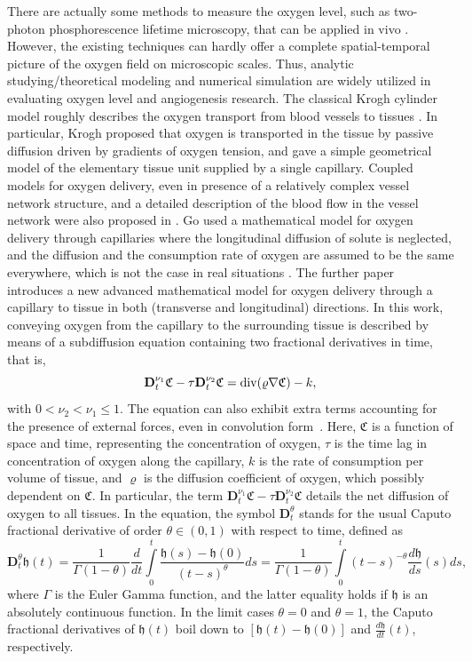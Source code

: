\documentclass[reqno]{amsart}
\theoremstyle{definition}
\numberwithin{equation}{section}
\begin{document}
There are actually some methods to measure the oxygen level, such as two-photon
phosphorescence lifetime microscopy, that can be applied in vivo \cite{LPRDHV}.
However, the existing techniques can hardly offer a complete spatial-temporal picture of the oxygen
field on microscopic scales. Thus, analytic studying/theoretical modeling \cite{G,Kr,Po,Po2} and numerical simulation
\cite{GP,LWWHTX,SHPD} are widely utilized in evaluating oxygen level and  angiogenesis research.
The classical Krogh cylinder model roughly describes the oxygen transport from blood vessels
to tissues \cite{Kr}. In particular, Krogh proposed that
oxygen is transported in the tissue by passive diffusion driven by gradients of oxygen
tension, and gave a simple geometrical model of the elementary tissue unit
supplied by a single capillary.
Coupled models for oxygen delivery, even in presence of a relatively complex vessel network
structure, and a detailed description of
the blood flow in the vessel network were also proposed in \cite{Gol,Po2}.
Go \cite{G} used a mathematical model for oxygen delivery through capillaries
where the longitudinal diffusion
of solute is neglected,
and the diffusion and the consumption rate of oxygen are assumed to be the same everywhere,
which is not the case in real situations \cite{LT}.
The further paper~\cite{SR} introduces a new advanced mathematical model for oxygen delivery through a capillary to tissue in both (transverse and longitudinal) directions.
In this work, conveying oxygen from the capillary to the surrounding tissue is described
by means of a subdiffusion equation containing two fractional derivatives in time, that is,
$$
\mathbf{D}_{t}^{\nu_1}\mathfrak{C}-\tau\mathbf{D}_{t}^{\nu_2}\mathfrak{C}={\rm div}(\varrho \nabla \mathfrak{C})-k,
$$
with $0<\nu_2<\nu_1\leq 1$. The equation can also exhibit extra terms accounting for the presence of external forces, even in convolution form~\cite{MGSKA}.
Here, $\mathfrak{C}$ is a function of space and time,
representing the concentration of oxygen, $\tau$ is the time lag in concentration of oxygen
along the capillary,
$k$ is the rate of consumption per volume of tissue, and $\varrho$ is the diffusion coefficient of oxygen, which  possibly dependent on $\mathfrak{C}$. In particular, the term $\mathbf{D}_{t}^{\nu_1}\mathfrak{C}-\tau\mathbf{D}_{t}^{\nu_2}\mathfrak{C}$
details the net diffusion of oxygen to all tissues.
In the equation, the symbol $\mathbf{D}_{t}^{\theta}$ stands for the usual Caputo fractional derivative of order
$\theta\in(0,1)$ with respect to time, defined as
\[
\mathbf{D}_{t}^{\theta}\mathfrak{h}(t)=\frac{1}{\Gamma(1-\theta)}\frac{d}{d t}\int\limits_{0}^{t}\frac{\mathfrak{h}(s)-\mathfrak{h}(0)}{(t-s)^{\theta}}ds=
\frac{1}{\Gamma(1-\theta)}\int\limits_{0}^{t}(t-s)^{-\theta}\frac{d \mathfrak{h}}{d s}(s)ds,
\]
where $\Gamma$ is the Euler Gamma function, and the latter equality holds
if $\mathfrak{h}$ is an absolutely continuous function.
In the limit cases $\theta=0$ and $\theta=1$, the Caputo fractional derivatives of $\mathfrak{h}(t)$ boil down to $[\mathfrak{h}(t)-\mathfrak{h}(0)]$ and $\frac{d \mathfrak{h}}{d t}(t)$, respectively.
\end{document}
